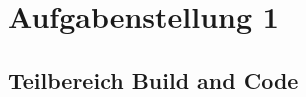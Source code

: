 \newpage
\section{Aufgabenstellung 1}

                      


\subsection{Teilbereich Build and Code}

